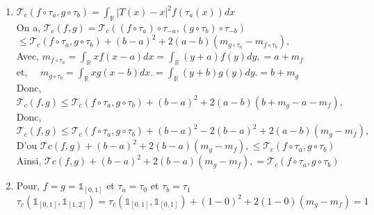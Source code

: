 \documentclass{report}
\begin{document}
{\begin{enumerate}
    \item
    $\mathcal{T}_c\left(f \circ \tau_a, g \circ \tau_b\right) = \int_{\mathbb{R}}|T(x)-x|^2 f(\tau_a(x))dx $ \\
    On a, $\mathcal{T}_c\left(f, g\right) = \mathcal{T}_c\left((f \circ \tau_{a}) \circ \tau_{-a}, (g \circ \tau_{b}) \circ \tau_{-b}\right)$
    $\leq \mathcal{T}_{c}(f \circ \tau_{a}, g \circ \tau_{b})+(b-a)^2+2(a-b)\left(m_{g \circ \tau_{a}} -m_{f \circ \tau_{b}}\right), $\\
    Avec, $m_{f \circ \tau_{a}}=\int_{\mathbb{R}} x f(x-a) d x = \int_{\mathbb{R}} (y+a) f(y) d y, = a + m_{f}$\\
    et, $\quad m_{g \circ \tau_{b}} =\int_{\mathbb{R}} x g(x-b) d x . = \int_{\mathbb{R}} (y+b) g(y) d y . = b + m_{g}$\\
    Donc, $\mathcal{T}_c(f, g) \le \mathcal{T}_{c}(f \circ \tau_{a}, g \circ \tau_{b})+(b-a)^2+2(a-b)\left(b + m_{g} - a - m_{f}\right), $\\
    Donc, $\mathcal{T}_c(f, g) \le \mathcal{T}_{c}(f \circ \tau_{a}, g \circ \tau_{b})+ (b-a)^2 -2(b-a)^2 +2(a-b)\left( m_{g} - m_{f}\right), $\\
    D'ou $  \mathcal{T} c(f, g)+(b-a)^2+2(b-a)\left(m_g-m_f\right), \leq \mathcal{T}_c\left(f \circ \tau_a, g \circ \tau_b\right)$\\
    Ainsi, $  \mathcal{T} c(f, g)+(b-a)^2+2(b-a)\left(m_g-m_f\right), = \mathcal{T}_c\left(f \circ \tau_a, g \circ \tau_b\right)$

    \item
        Pour, $f = g = \mathbb{1}_{[0,1]}$ et $\tau_{a} = \tau_{0}$ et $\tau_{b} = \tau_{1}$\\
        $\tau_{c}(\mathbb{1}_{[0,1]} ,\mathbb{1}_{[1,2]}) = \tau_{c}(\mathbb{1}_{[0,1]}, \mathbb{1}_{[0,1]}) + (1-0)^{2} + 2(1-0)(m_g - m_f) = 1$
    \end{enumerate}
}
\end{document}
